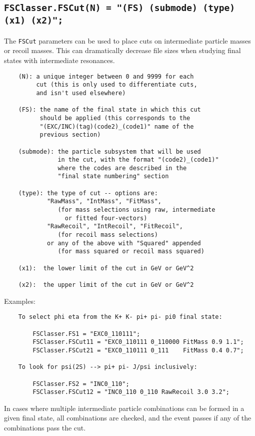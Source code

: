 \documentclass[11pt,a4paper]{define/cepcnote}
\begin{document}
\subsection{\tt FSClasser.FSCut(N) = "(FS) (submode) (type) (x1) (x2)";}

The {\tt FSCut} parameters can be used to place cuts on intermediate particle masses or recoil masses.  
This can dramatically decrease file sizes when studying final states with intermediate resonances.

\begin{verbatim}
    (N): a unique integer between 0 and 9999 for each 
         cut (this is only used to differentiate cuts, 
         and isn't used elsewhere)

    (FS): the name of the final state in which this cut
          should be applied (this corresponds to the
          "(EXC/INC)(tag)(code2)_(code1)" name of the
          previous section) 

    (submode): the particle subsystem that will be used
               in the cut, with the format "(code2)_(code1)"
               where the codes are described in the
               "final state numbering" section

    (type): the type of cut -- options are:
            "RawMass", "IntMass", "FitMass",
               (for mass selections using raw, intermediate
                 or fitted four-vectors) 
            "RawRecoil", "IntRecoil", "FitRecoil",
               (for recoil mass selections)
            or any of the above with "Squared" appended
               (for mass squared or recoil mass squared)

    (x1):  the lower limit of the cut in GeV or GeV^2

    (x2):  the upper limit of the cut in GeV or GeV^2
\end{verbatim}

Examples:

\begin{verbatim}
    To select phi eta from the K+ K- pi+ pi- pi0 final state:

        FSClasser.FS1 = "EXC0_110111";
        FSClasser.FSCut11 = "EXC0_110111 0_110000 FitMass 0.9 1.1";
        FSClasser.FSCut21 = "EXC0_110111 0_111    FitMass 0.4 0.7";

    To look for psi(2S) --> pi+ pi- J/psi inclusively:

        FSClasser.FS2 = "INC0_110";
        FSClasser.FSCut12 = "INC0_110 0_110 RawRecoil 3.0 3.2";
\end{verbatim}
In cases where multiple intermediate particle combinations can be formed in a given final state, all combinations are checked, and the event passes if any of the combinations pass the cut.
\end{document}
